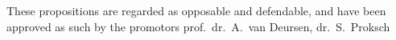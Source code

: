 \documentclass{propositions}
\begin{document}

\begin{center}
These propositions are regarded as opposable and defendable, and have been approved as such by the
promotors prof.\ dr.\ A.\ van Deursen, dr.\ S.\ Proksch
\end{center}




















\end{document}
